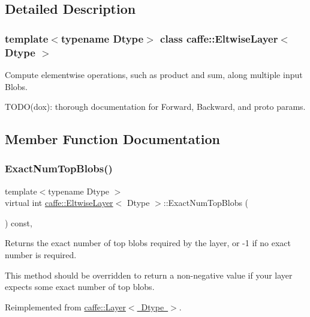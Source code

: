 \subsection{Detailed Description}
\subsubsection*{template$<$typename Dtype$>$\newline
class caffe\+::\+Eltwise\+Layer$<$ Dtype $>$}

Compute elementwise operations, such as product and sum, along multiple input Blobs. 

T\+O\+D\+O(dox)\+: thorough documentation for Forward, Backward, and proto params. 

\subsection{Member Function Documentation}
\mbox{\label{classcaffe_1_1_eltwise_layer_a60ae4a38cade1cc7f6111e51cabb441b}} 
\subsubsection{\texorpdfstring{Exact\+Num\+Top\+Blobs()}{ExactNumTopBlobs()}\hspace{0.1cm}{\footnotesize\ttfamily [1/2]}}
{\footnotesize\ttfamily template$<$typename Dtype $>$ \\
virtual int \mbox{\hyperlink{classcaffe_1_1_eltwise_layer}{caffe\+::\+Eltwise\+Layer}}$<$ Dtype $>$\+::Exact\+Num\+Top\+Blobs (\begin{DoxyParamCaption}{ }\end{DoxyParamCaption}) const\hspace{0.3cm}{\ttfamily [inline]}, {\ttfamily [virtual]}}



Returns the exact number of top blobs required by the layer, or -\/1 if no exact number is required. 

This method should be overridden to return a non-\/negative value if your layer expects some exact number of top blobs. 

Reimplemented from \mbox{\hyperlink{classcaffe_1_1_layer_a64e2ca72c719e4b2f1f9216ccfb0d37f}{caffe\+::\+Layer$<$ Dtype $>$}}.

